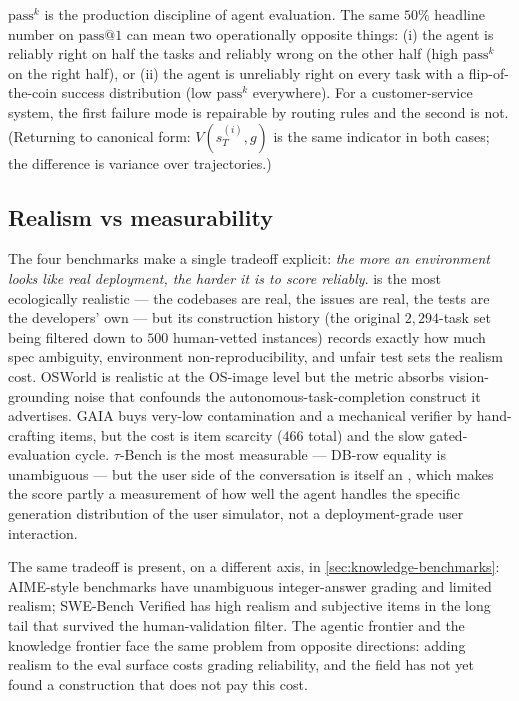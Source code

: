 \begin{intuition}
$\mathrm{pass}^k$ is the production discipline of agent evaluation.
The same $50\%$ headline number on $\mathrm{pass}@1$ can mean two
operationally opposite things: (i) the agent is reliably right on
half the tasks and reliably wrong on the other half (high
$\mathrm{pass}^k$ on the right half), or (ii) the agent is
unreliably right on every task with a flip-of-the-coin success
distribution (low $\mathrm{pass}^k$ everywhere). For a customer-service
system, the first failure mode is repairable by routing rules and
the second is not. (Returning to canonical form: $V(s_T^{(i)}, g)$ is
the same indicator in both cases; the difference is variance over
trajectories.)
\end{intuition}

\subsection{Realism vs measurability}
\label{sec:agentic-realism-vs-measurability}

The four benchmarks make a single tradeoff explicit:
\emph{the more an environment looks like real deployment, the harder
it is to score reliably}.  is the most ecologically
realistic --- the codebases are real, the issues are real, the tests
are the developers' own --- but its construction history (the original
$2{,}294$-task set being filtered down to $500$ human-vetted
instances) records exactly how much spec ambiguity, environment
non-reproducibility, and unfair test sets the realism cost.
OSWorld is realistic at the OS-image level but the metric absorbs
vision-grounding noise that confounds the autonomous-task-completion
construct it advertises. GAIA buys very-low contamination and a
mechanical verifier by hand-crafting items, but the cost is item
scarcity ($466$ total) and the slow gated-evaluation cycle. $\tau$-Bench
is the most measurable --- DB-row equality is unambiguous --- but
the user side of the conversation is itself an , which makes the
score partly a measurement of how well the agent handles the
specific generation distribution of the user simulator, not a
deployment-grade user interaction.

The same tradeoff is present, on a different axis, in
\cref{sec:knowledge-benchmarks}: AIME-style benchmarks have
unambiguous integer-answer grading and limited realism; SWE-Bench
Verified has high realism and subjective items in the long tail
that survived the human-validation filter. The agentic frontier and
the knowledge frontier face the same problem from opposite directions:
adding realism to the eval surface costs grading reliability, and
the field has not yet found a construction that does not pay this
cost.

